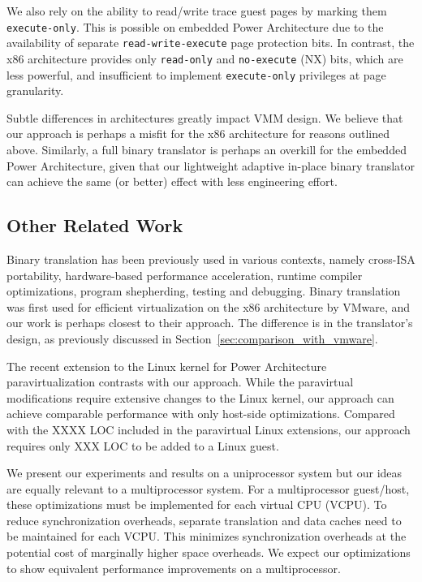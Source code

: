 \documentclass[10pt,twocolumn]{article}
\begin{document}
We also rely on the ability to read/write trace guest pages by marking them
{\tt execute-only}. This is possible on embedded Power Architecture due to the
availability of separate
{\tt read-write-execute} page protection bits.
In contrast, the x86 architecture provides only {\tt read-only} and
{\tt no-execute} (NX) bits, which are less powerful, and insufficient
to implement {\tt execute-only} privileges at page granularity.

Subtle
differences in architectures greatly impact VMM design. We believe that our
approach is perhaps a misfit for the x86 architecture for reasons outlined above.
Similarly, a full binary translator is perhaps an overkill for the embedded
Power Architecture, given that our lightweight adaptive in-place binary translator
can achieve the same (or better) effect with less engineering effort.

\subsection{Other Related Work}
Binary translation has been previously used in various contexts, namely
cross-ISA portability\cite{bansal:osdi08, qemu:software}, hardware-based
performance acceleration\cite{transmeta_crusoe:chip}, runtime compiler
optimizations\cite{bala00dynamo}, program shepherding\cite{bruening04thesis},
testing and debugging\cite{valgrind}. Binary translation was
first used for efficient virtualization on the x86 architecture by
VMware\cite{agesen:comparison}, and our work
is perhaps closest to their approach. The difference is in the translator's design,
as previously discussed in Section~\ref{sec:comparison_with_vmware}.

The recent extension to the Linux kernel for Power Architecture paravirtualization
contrasts with our approach. While the paravirtual modifications require extensive
changes to the Linux kernel, our approach can achieve comparable performance
with only host-side optimizations. Compared with the XXXX LOC included in the
paravirtual Linux extensions, our approach requires only XXX LOC to be added to
a Linux guest.

We present our experiments and results on a uniprocessor system but our
ideas are equally relevant to a multiprocessor system. For a multiprocessor
guest/host, these optimizations must be implemented for each virtual CPU (VCPU).
To reduce synchronization
overheads, separate translation and data caches need to be maintained for each VCPU.
This minimizes synchronization overheads at the potential cost of marginally higher
space overheads. We expect
our optimizations to show equivalent performance improvements on a multiprocessor.
\end{document}
